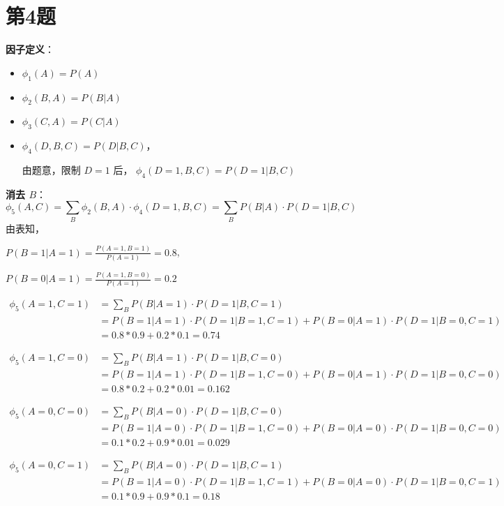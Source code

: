\documentclass{article}
\begin{document}
\section*{第4题}


\textbf{因子定义}：
\begin{itemize}
    \item \( \phi_1(A) = P(A) \)
    \item \( \phi_2(B, A) = P(B|A) \)
    \item \( \phi_3(C, A) = P(C|A) \)
    \item \( \phi_4(D, B, C) = P(D|B,C) \)，
    
    由题意，限制 \( D=1 \) 后， \( \phi_4(D=1, B, C) = P(D=1|B,C) \)
\end{itemize}

\textbf{消去 \( B \)}：
\[
\phi_5(A, C) = \sum_{B} \phi_2(B, A) \cdot \phi_4(D=1, B, C) = \sum_{B} P(B|A) \cdot P(D=1|B,C)
\]
由表知，

\(P(B=1|A=1)=\frac{P(A=1,B=1)}{P(A=1)}=0.8\),

\(P(B=0|A=1)=\frac{P(A=1,B=0)}{P(A=1)}=0.2\)

\begin{align}
\phi_5(A=1,C=1)&=\sum_{B}P(B|A=1)\cdot P(D=1|B,C=1)\\
    &=P(B=1|A=1)\cdot P(D=1|B=1,C=1)+P(B=0|A=1)\cdot P(D=1|B=0,C=1)\\
    &=0.8*0.9+0.2*0.1=0.74
\end{align}

\begin{align}
\phi_5(A=1,C=0)&=\sum_{B}P(B|A=1)\cdot P(D=1|B,C=0)\\
    &=P(B=1|A=1)\cdot P(D=1|B=1,C=0)+P(B=0|A=1)\cdot P(D=1|B=0,C=0)\\
    &=0.8*0.2+0.2*0.01=0.162
\end{align}

\begin{align}
\phi_5(A=0,C=0)&=\sum_{B}P(B|A=0)\cdot P(D=1|B,C=0)\\
    &=P(B=1|A=0)\cdot P(D=1|B=1,C=0)+P(B=0|A=0)\cdot P(D=1|B=0,C=0)\\
    &=0.1*0.2+0.9*0.01=0.029
\end{align}

\begin{align}
\phi_5(A=0,C=1)&=\sum_{B}P(B|A=0)\cdot P(D=1|B,C=1)\\
    &=P(B=1|A=0)\cdot P(D=1|B=1,C=1)+P(B=0|A=0)\cdot P(D=1|B=0,C=1)\\
    &=0.1*0.9+0.9*0.1=0.18
\end{align}
\end{document}
